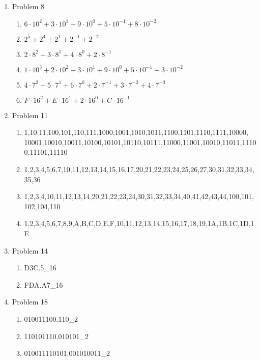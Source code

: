 \begin{enumerate}[leftmargin=2cm,labelsep=.5cm,label=\bf\arabic*.]

\item Problem 8
\begin{enumerate}
  \item $6 \cdot 10^2 + 3 \cdot 10^1 + 9 \cdot 10^0 + 5 \cdot 10^{-1} + 8 \cdot 10^{-2}$
  \item $2^5 + 2^4 + 2^1 + 2^{-1} + 2^{-2}$
  \item $2 \cdot 8^2 + 3 \cdot 8^1 + 4 \cdot 8^0 + 2 \cdot 8^{-1}$
  \item $1 \cdot 10^3 + 2 \cdot 10^2 + 3 \cdot 10^1 + 9 \cdot 10^0 + 5 \cdot 10^{-1} + 3 \cdot 10^{-2}$
  \item $4 \cdot 7^2 + 5 \cdot 7^1 + 6 \cdot 7^0 + 2 \cdot 7^{-1} + 3 \cdot 7^{-2} + 4 \cdot 7^{-3}$
  \item $F \cdot 16^2 + E \cdot 16^1 + 2 \cdot 16^0 + C \cdot 16^{-1}$\\[1cm]
\end{enumerate}

\item Problem 11
\begin{enumerate}
  \item 1,10,11,100,101,110,111,1000,1001,1010,1011,1100,1101,1110,1111,10000,\\
  10001,10010,10011,10100,10101,10110,10111,11000,11001,10010,11011,11100,11101,11110
  \item 1,2,3,4,5,6,7,10,11,12,13,14,15,16,17,20,21,22,23,24,25,26,27,30,31,32,33,34,35,36
  \item 1,2,3,4,10,11,12,13,14,20,21,22,23,24,30,31,32,33,34,40,41,42,43,44,100,101,102,104,110
  \item 1,2,3,4,5,6,7,8,9,A,B,C,D,E,F,10,11,12,13,14,15,16,17,18,19,1A,1B,1C,1D,1E\\[1cm]
\end{enumerate}

\item Problem 14
\begin{enumerate}
  \item D3C.5_{16}
  \item FDA.A7_{16}\\[1cm]
\end{enumerate}

\item Problem 18
\begin{enumerate}
  \item 010011100.110_2
  \item 110101110.010101_2
  \item 010011110101.001010011_2\\[1cm]
\end{enumerate}


\end{enumerate}
